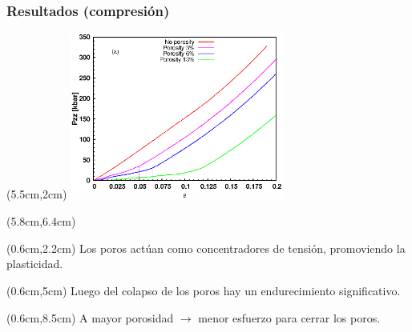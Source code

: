 \begin{frame}
    \frametitle{Resultados (compresi\'on)}
    \begin{textblock*}{7cm}(5.5cm,2cm) %
        \includegraphics[width=7cm]{Presentacion_PANACM_Franco/Pzz_strain_comp_dash.eps}
    \end{textblock*}
    \begin{textblock*}{4.2cm}(5.8cm,6.4cm) %
    \end{textblock*}
    \begin{textblock*}{5cm}(0.6cm,2.2cm) %
        Los poros act\'uan como concentradores de tensi\'on, promoviendo la plasticidad. %
    \end{textblock*}
    \begin{textblock*}{4.5cm}(0.6cm,5cm) %
        Luego del colapso de los poros hay un endurecimiento significativo. %
    \end{textblock*}
    \begin{textblock*}{12cm}(0.6cm,8.5cm) %
        A mayor porosidad $\rightarrow$ menor esfuerzo para cerrar los poros.
    \end{textblock*}
\end{frame}

